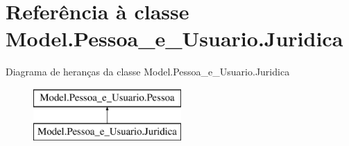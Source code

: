 \hypertarget{class_model_1_1_pessoa__e___usuario_1_1_juridica}{}\section{Referência à classe Model.\+Pessoa\+\_\+e\+\_\+\+Usuario.\+Juridica}
\label{class_model_1_1_pessoa__e___usuario_1_1_juridica}
Diagrama de heranças da classe Model.\+Pessoa\+\_\+e\+\_\+\+Usuario.\+Juridica\begin{figure}[H]
\begin{center}
\leavevmode
\includegraphics[height=2.000000cm]{class_model_1_1_pessoa__e___usuario_1_1_juridica}
\end{center}
\end{figure}
